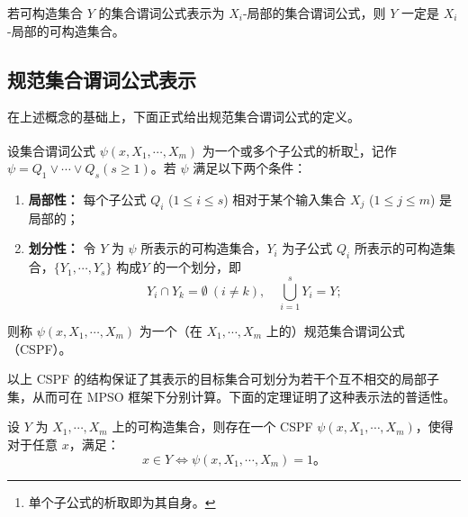 \begin{corollary}
若可构造集合 $Y$ 的集合谓词公式表示为 $X_i$-局部的集合谓词公式，则 $Y$ 一定是 $X_i$-局部的可构造集合。
\end{corollary}

\subsection{规范集合谓词公式表示}

在上述概念的基础上，下面正式给出规范集合谓词公式的定义。

\begin{definition}\label{def:cspf}
设集合谓词公式 $\psi(x, X_1, \cdots, X_m)$ 为一个或多个子公式的析取\footnote{单个子公式的析取即为其自身。}，记作 $\psi = Q_1 \lor \cdots \lor Q_s (s \ge 1)$。若 $\psi$ 满足以下两个条件：
\begin{enumerate}
\item \textbf{局部性：} 每个子公式 $Q_i$ ($1 \leq i \leq s$)  相对于某个输入集合 $X_j$ ($1 \leq j \leq m$) 是局部的；
\item \textbf{划分性：} 令 $Y$ 为 $\psi$ 所表示的可构造集合，$Y_i$ 为子公式 $Q_i$ 所表示的可构造集合，$\{Y_1,\cdots,Y_s\}$ 构成$Y$ 的一个划分，即 $$Y_i \cap Y_k = \emptyset \ (i \ne k), \quad \bigcup_{i=1}^s Y_i = Y;$$
\end{enumerate}
则称 $\psi(x, X_1, \cdots, X_m)$ 为一个（在 $X_1, \cdots, X_m$ 上的）规范集合谓词公式（CSPF）。
\end{definition}

以上 CSPF 的结构保证了其表示的目标集合可划分为若干个互不相交的局部子集，从而可在 MPSO 框架下分别计算。下面的定理证明了这种表示法的普适性。

\begin{theorem}\label{theorem:set2}
设 $Y$ 为 $X_1,\cdots,X_m$ 上的可构造集合，则存在一个 CSPF $\psi(x, X_1, \cdots, X_m)$，使得对于任意 $x$，满足：
$$x \in Y \iff \psi(x, X_1, \cdots, X_m) = 1。$$
\end{theorem}

